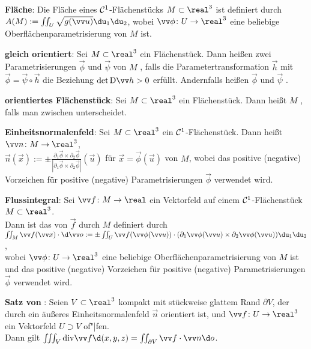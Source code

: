 \linie

\textbf{Fläche}:
Die Fläche eines $\mathcal{C}^1$-Flächenstücks $M \subset \real^3$ ist definiert durch\\
$A(M) := \iint_U \sqrt{g(\vec{u})} \du_1 \du_2$,
wobei $\vec{\phi}\colon U \to \real^3$ eine beliebige Oberflächenparametrisierung von $M$ ist.

\linie

\textbf{gleich orientiert}:
Sei $M \subset \real^3$ ein Flächenstück.
Dann heißen zwei Parametrisierungen $\vec{\phi}$ und $\vec{\psi}$ von $M$
, falls die Parametertransformation $\vec{h}$ mit
$\vec{\phi} = \vec{\psi} \circ \vec{h}$ die Beziehung $\det \D\vec{h} > 0$ erfüllt.
Andernfalls heißen $\vec{\phi}$ und $\vec{\psi}$ .

\textbf{orientiertes Flächenstück}:
Sei $M \subset \real^3$ ein Flächenstück.
Dann heißt $M$ , falls man zwischen
 unterscheidet.

\textbf{Einheitsnormalenfeld}:
Sei $M \subset \real^3$ ein $\mathcal{C}^1$-Flächenstück.
Dann heißt $\vec{n}\colon M \to \real^3$,\\
$\vec{n}(\vec{x}) := \pm\frac{\partial_1 \vec{\phi} \times \partial_2 \vec{\phi}}
{|\partial_1 \vec{\phi} \times \partial_2 \vec{\phi}|}(\vec{u})$ für
$\vec{x} = \vec{\phi}(\vec{u})$  von $M$,
wobei das positive (negative) Vorzeichen für positive (negative) Parametrisierungen
$\vec{\phi}$ verwendet wird.

\textbf{Flussintegral}:
Sei $\vec{f}\colon M \to \real$ ein Vektorfeld auf einem $\mathcal{C}^1$-Flächenstück $M \subset \real^3$.\\
Dann ist das  von $\vec{f}$ durch $M$ definiert durch\\
$\iint_M \vec{f}(\vec{x}) \cdot \d\vec{o} := \pm\iint_U \vec{f}(\vec{\phi}(\vec{u})) \cdot
(\partial_1 \vec{\phi}(\vec{u}) \times \partial_2 \vec{\phi}(\vec{u})) \du_1 \du_2$,\\
wobei $\vec{\phi}\colon U \to \real^3$ eine beliebige Oberflächenparametrisierung von $M$ ist
und das positive (negative) Vorzeichen für positive (negative) Parametrisierungen
$\vec{\phi}$ verwendet wird.

\linie

\textbf{Satz von }:
Seien $V \subset \real^3$ kompakt mit stückweise glattem Rand $\partial V$,
der durch ein äußeres Einheitsnormalenfeld $\vec{n}$ orientiert ist, und
$\vec{f}\colon U \to \real^3$ ein Vektorfeld $U \supset V$ of"|fen.\\
Dann gilt $\iiint_V \div \vec{f} \d(x, y, z) = \iint_{\partial V} \vec{f} \cdot \vec{n} \d o$.

